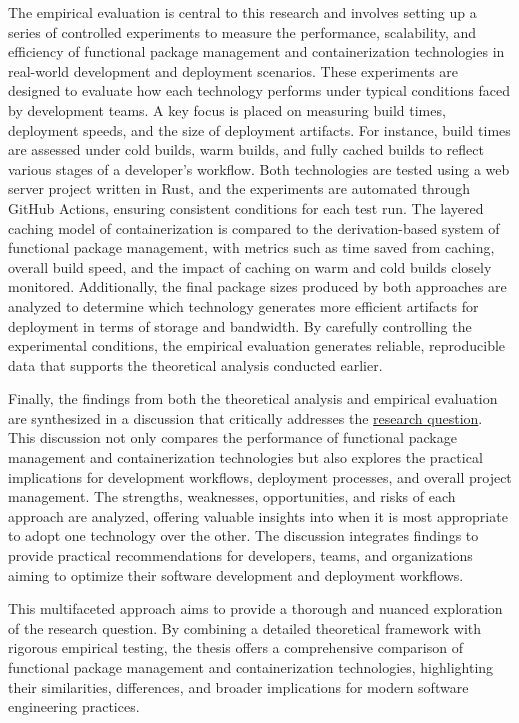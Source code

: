 The empirical evaluation is central to this research and involves setting up a series of
controlled experiments to measure the performance, scalability, and efficiency of functional
package management and containerization technologies in real-world development and deployment
scenarios. These experiments are designed to evaluate how each technology performs under
typical conditions faced by development teams. A key focus is placed on measuring build
times, deployment speeds, and the size of deployment artifacts. For instance, build times
are assessed under cold builds, warm builds, and fully cached builds to reflect various
stages of a developer’s workflow. Both technologies are tested using a web server project
written in Rust, and the experiments are automated through GitHub Actions, ensuring consistent
conditions for each test run. The layered caching model of containerization is compared
to the derivation-based system of functional package management, with metrics such as time
saved from caching, overall build speed, and the impact of caching on warm and cold builds
closely monitored. Additionally, the final package sizes produced by both approaches are
analyzed to determine which technology generates more efficient artifacts for deployment
in terms of storage and bandwidth. By carefully controlling the experimental conditions,
the empirical evaluation generates reliable, reproducible data that supports the theoretical
analysis conducted earlier.

Finally, the findings from both the theoretical analysis and empirical evaluation are
synthesized in a discussion that critically addresses the \hyperlink{research_question}
{research question}. This discussion not only compares the performance of functional
package management and containerization technologies but also explores the practical
implications for development workflows, deployment processes, and overall project
management. The strengths, weaknesses, opportunities, and risks of each approach are
analyzed, offering valuable insights into when it is most appropriate to adopt one
technology over the other. The discussion integrates findings to provide practical
recommendations for developers, teams, and organizations aiming to optimize their software
development and deployment workflows.

This multifaceted approach aims to provide a thorough and nuanced exploration of the
research question. By combining a detailed theoretical framework with rigorous empirical
testing, the thesis offers a comprehensive comparison of functional package management
and containerization technologies, highlighting their similarities, differences, and
broader implications for modern software engineering practices.
